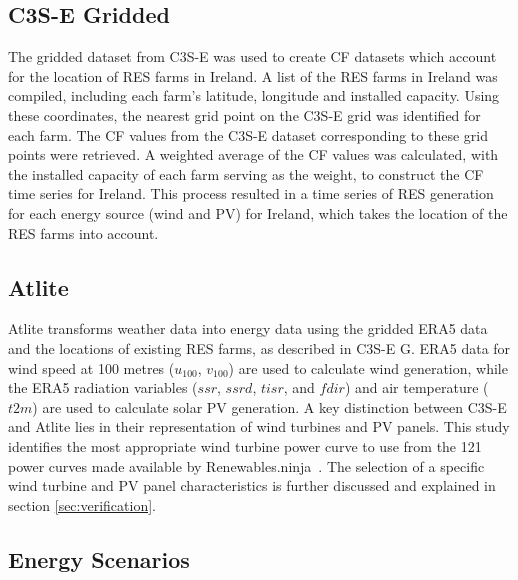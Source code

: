 \documentclass[preprint, 12pt]{elsarticle}
\begin{document}
\subsection{C3S-E Gridded}
\label{sec:c3se_g}

The gridded dataset from C3S-E was used to create CF datasets which account for the location of RES farms in Ireland. A list of the RES farms in Ireland was compiled, including each farm’s latitude, longitude and installed capacity. Using these coordinates, the nearest grid point on the C3S-E grid was identified for each farm. The CF values from the C3S-E dataset corresponding to these grid points were retrieved. A weighted average of the CF values was calculated, with the installed capacity of each farm serving as the weight, to construct the CF time series for Ireland. This process resulted in a time series of RES generation for each energy source (wind and PV) for Ireland, which takes the location of the RES farms into account.

\subsection{Atlite} 
\label{sec:atlite}

Atlite transforms weather data into energy data using the gridded ERA5 data and the locations of existing RES farms, as described in C3S-E G. ERA5 data for wind speed at 100 metres ($u_{100}$, $v_{100}$) are used to calculate wind generation, while the ERA5 radiation variables ($ssr$, $ssrd$, $tisr$, and $fdir$) and air temperature ($t2m$) are used to calculate solar PV generation. A key distinction between C3S-E and Atlite lies in their representation of wind turbines and PV panels. This study identifies the most appropriate wind turbine power curve to use from the 121 power curves made available by Renewables.ninja~\citep{staffell2016wake}. The selection of a specific wind turbine and PV panel characteristics is further discussed and explained in section \ref{sec:verification}.

\subsection{Energy Scenarios}
\label{sec:scenarios}
\end{document}
